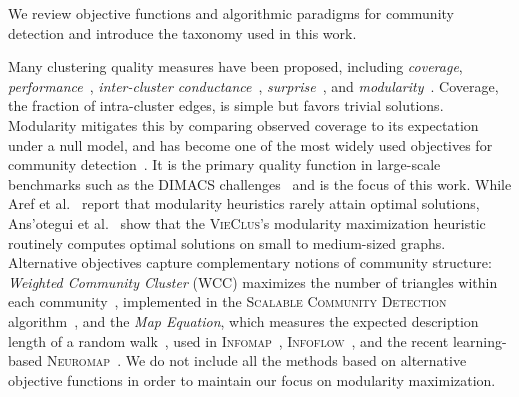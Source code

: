 \documentclass[../paper.tex]{subfiles}
\begin{document}

We review objective functions and algorithmic paradigms for community detection and introduce the taxonomy used in this work.

Many clustering quality measures have been proposed, including \emph{coverage}, \emph{performance}~\cite{Gaertler2005}, \emph{inter-cluster conductance}~\cite{kannan2004clusterings}, \emph{surprise}~\cite{arnau2004iterative}, and \emph{modularity}~\cite{girvan2002}. Coverage, the fraction of intra-cluster edges, is simple but favors trivial solutions. Modularity mitigates this by comparing observed coverage to its expectation under a null model, and has become one of the most widely used objectives for community detection~\cite{licommunitydetectionsurvey24}. It is the primary quality function in large-scale benchmarks such as the DIMACS challenges~\cite{dimacschallengegraphpartandcluster} and is the focus of this work. While Aref et al.~\cite{survey2023} report that modularity heuristics rarely attain optimal solutions, Ans{'o}tegui et al.~\cite{maxsat2025} show that the \textsc{VieClus}'s modularity maximization heuristic routinely computes optimal solutions on small to medium-sized graphs.
Alternative objectives capture complementary notions of community structure: \textit{Weighted Community Cluster} (WCC) maximizes the number of triangles within each community~\cite{wcc2012}, implemented in the  \textsc{Scalable Community Detection} algorithm~\cite{scd2014}, and the \textit{Map Equation}, which measures the expected description length of a random walk~\cite{infomap2008}, used in \textsc{Infomap}~\cite{infomap2008}, \textsc{Infoflow}~\cite{infoflow2019}, and the recent learning-based \textsc{Neuromap}~\cite{neuromap2024}. We do not include all the methods based on alternative objective functions in order to maintain our focus on modularity maximization.
\end{document}
